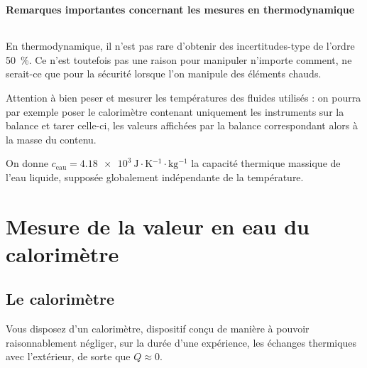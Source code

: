 \documentclass[a4paper,french,bookmarks]{article}
\begin{document}


\text{}\hfill\\

\textbf{Remarques importantes concernant les mesures en thermodynamique}
\hfill
%
\begin{minipage}{0.35\linewidth}
	\centering
	\begin{tabular}{c|c}
	\end{tabular}
\end{minipage}
%
\begin{enumerate}
    \itt En thermodynamique, il n'est pas rare d'obtenir des incertitudes-type de l'ordre \SI{50}{\percent}. Ce n'est toutefois pas une raison pour manipuler n'importe comment, ne serait-ce que pour la sécurité lorsque l'on manipule des éléments chauds.
    
    \itt Attention à bien peser et mesurer les températures des fluides utilisés : on pourra par exemple poser le calorimètre contenant uniquement les instruments sur la balance et tarer celle-ci, les valeurs affichées par la balance correspondant alors à la masse du contenu.
\end{enumerate}

On donne $c_\text{eau} = \SI{4.18e3}{\joule \cdot \K^{-1} \cdot \kg^{-1}}$ la capacité thermique massique de l'eau liquide, supposée globalement indépendante de la température.


\section{Mesure de la valeur en eau du calorimètre}

\subsection{Le calorimètre}

Vous disposez d'un calorimètre, dispositif conçu de manière à pouvoir raisonnablement négliger, sur la durée d'une expérience, les échanges thermiques avec l'extérieur, de sorte que $Q \approx 0$.
\end{document}
